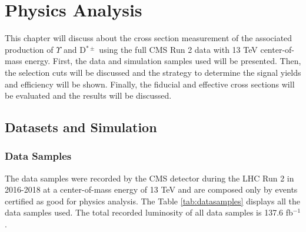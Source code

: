 \chapter{Physics Analysis}

This chapter will discuss about the cross section measurement of the associated production of $\Upsilon$ and D$^{*\pm}$ using the full CMS Run 2 data with 13 TeV center-of-mass energy. First, the data and simulation samples used will be presented. Then, the selection cuts will be discussed and the strategy to determine the signal yields and efficiency will be shown. Finally, the fiducial and effective cross sections will be evaluated and the results will be discussed.

\section{Datasets and Simulation}
\subsection{Data Samples}

The data samples were recorded by the CMS detector during the LHC Run 2 in 2016-2018 at a center-of-mass energy of 13 TeV and are composed only by events certified as good for physics analysis. The Table \ref{tab:datasamples} displays all the data samples used. The total recorded luminosity of all data samples is 137.6 fb$^{-1}$.

